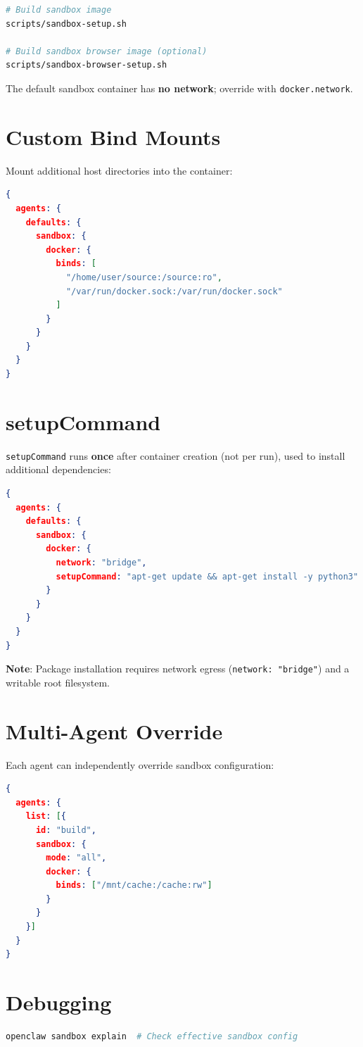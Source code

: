 \begin{lstlisting}[language=bash]
# Build sandbox image
scripts/sandbox-setup.sh

# Build sandbox browser image (optional)
scripts/sandbox-browser-setup.sh
\end{lstlisting}

The default sandbox container has \textbf{no network}; override with \texttt{docker.network}.

\section{Custom Bind Mounts}

Mount additional host directories into the container:

\begin{lstlisting}[language=json]
{
  agents: {
    defaults: {
      sandbox: {
        docker: {
          binds: [
            "/home/user/source:/source:ro",
            "/var/run/docker.sock:/var/run/docker.sock"
          ]
        }
      }
    }
  }
}
\end{lstlisting}

\section{setupCommand}

\texttt{setupCommand} runs \textbf{once} after container creation (not per run), used to install additional dependencies:

\begin{lstlisting}[language=json]
{
  agents: {
    defaults: {
      sandbox: {
        docker: {
          network: "bridge",
          setupCommand: "apt-get update && apt-get install -y python3"
        }
      }
    }
  }
}
\end{lstlisting}

\textbf{Note}: Package installation requires network egress (\texttt{network: "bridge"}) and a writable root filesystem.

\section{Multi-Agent Override}

Each agent can independently override sandbox configuration:

\begin{lstlisting}[language=json]
{
  agents: {
    list: [{
      id: "build",
      sandbox: {
        mode: "all",
        docker: {
          binds: ["/mnt/cache:/cache:rw"]
        }
      }
    }]
  }
}
\end{lstlisting}

\section{Debugging}

\begin{lstlisting}[language=bash]
openclaw sandbox explain  # Check effective sandbox config
\end{lstlisting}

